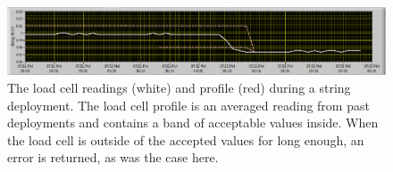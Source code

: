 \begin{figure}
    \centering
    \includegraphics[width=0.8\linewidth]{Figures/LoadCellProfile.png}
    \caption[The load cell readings and profile during a string deployment.]
    {The load cell readings (white) and profile (red) during a string deployment.
    The load cell profile is an averaged reading from past deployments and contains a band of acceptable values inside.
    When the load cell is outside of the accepted values for long enough, an error is returned, as was the case here.}
    \label{fig:load_cell_profile}
\end{figure}

